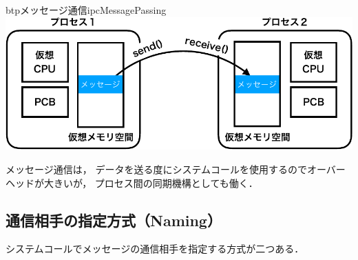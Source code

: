 \begin{myfig}{btp}{メッセージ通信}{ipcMessagePassing}
  \includegraphics[scale=0.6]{Fig/ipcMessagePassing-crop.pdf}
\end{myfig}

メッセージ通信は，
データを送る度にシステムコールを使用するのでオーバーヘッドが大きいが，
プロセス間の同期機構としても働く．

\subsection{通信相手の指定方式（Naming）}
システムコールでメッセージの通信相手を指定する方式が二つある．

